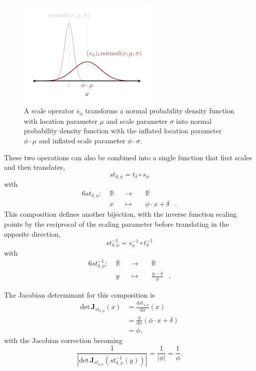 \documentclass[
  letterpaper,
  DIV=11,
  numbers=noendperiod]{scrartcl}
\begin{document}
\begin{figure}

{\centering \includegraphics[width=0.6\textwidth,height=\textheight]{figures/pushforwards_density_functions/scale/scale.pdf}

}

\caption{\label{fig-scale}A scale operator \(s_{\phi}\) transforms a
normal probability density function with location parameter \(\mu\) and
scale parameter \(\sigma\) into normal probability density function with
the inflated location parameter \(\phi \cdot \mu\) and inflated scale
parameter \(\phi \cdot \sigma\).}

\end{figure}

These two operations can also be combined into a single function that
first scales and then translates, \[
st_{\delta, \phi} = t_{\delta} \circ s_{\phi}
\] with \begin{alignat*}{6}
st_{\delta, \phi} :\; & \mathbb{R} & &\rightarrow& \; & \mathbb{R} &
\\
& x & &\mapsto& & \phi \cdot x + \delta &.
\end{alignat*} This composition defines another bijection, with the
inverse function scaling points by the reciprocal of the scaling
parameter before translating in the opposite direction, \[
st_{\delta, \phi}^{-1} = s_{\phi}^{-1} \circ t_{\delta}^{-1}
\] with \begin{alignat*}{6}
st_{\delta, \phi}^{-1} :\; & \mathbb{R} & &\rightarrow& \; & \mathbb{R} &
\\
& y & &\mapsto& & \frac{y - \delta}{\phi}  &.
\end{alignat*}

The Jacobian determinant for this composition is \begin{align*}
\mathrm{det} \, \mathbf{J}_{st_{\delta, \phi}}(x)
&= \frac{ \mathrm{d} st_{\delta, \phi} }{ \mathrm{d} x }(x)
\\
&= \frac{ \mathrm{d} }{ \mathrm{d} x } ( \phi \cdot x + \delta )
\\
&= \phi,
\end{align*} with the Jacobian correction becoming \[
\frac{1}
{| \mathrm{det} \, \mathbf{J}_{st_{\delta, \phi}}
(st_{\delta, \phi}^{-1}(y)) |}
=
\frac{1}{ | \phi | }
=
\frac{1}{ \phi }.
\]
\end{document}
